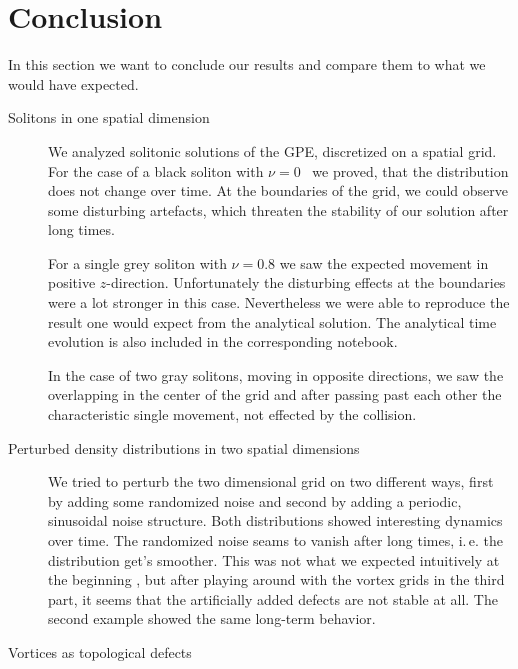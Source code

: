 \section{Conclusion}
In this section we want to conclude our results and compare them to what we would have expected.
\begin{description}
	\item[Solitons in one spatial dimension] 
We analyzed solitonic solutions of the GPE, discretized on a spatial grid. For the case of a black soliton with $\nu=0$ \ we proved, that the distribution does not change over time. At the boundaries of the grid, we could observe some disturbing artefacts, which threaten the stability of our solution after long times.

For a single grey soliton with $\nu = 0.8$ we saw the expected movement in positive $z$-direction. Unfortunately the disturbing effects at the boundaries were a lot stronger in this case. Nevertheless we were able  to reproduce the result one would expect from the analytical solution. The analytical time evolution is also included in the corresponding notebook.
	
In the case of two gray solitons, moving in opposite directions, we saw the overlapping in the center of the grid and after passing past each other the characteristic single movement, not effected by the collision. 
	
	\item[Perturbed density distributions in two spatial dimensions]
We tried to perturb the two dimensional grid on two different ways, first by adding some randomized noise and second by adding a periodic, sinusoidal noise structure. Both distributions showed interesting dynamics over time. The randomized noise seams to vanish after long times, i.\,e. the distribution get's smoother. This was not what we expected intuitively at the beginning , but after playing around with the vortex grids in the third part, it seems that the artificially added defects are not stable at all. The second example showed the same long-term behavior.
  
	\item[Vortices as topological defects]

\end{description}
